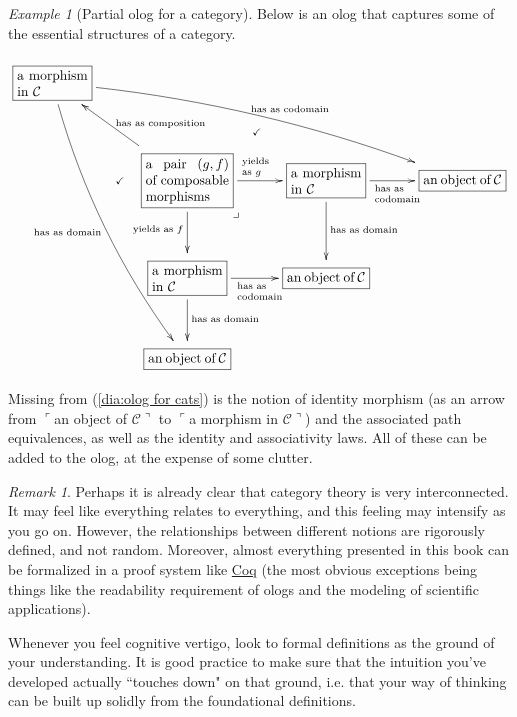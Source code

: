 \documentclass{book}
\def\tn{\textnormal}
\def\mc{\mathcal}
\def\hsp{\hspace{.3in}}
\def\rr{\raggedright}
\newcommand{\obox}[3]{\stackrel{#1}{\fbox{\parbox{#2}{#3}}}}
\newcommand{\fakebox}[1]{\tn{$\ulcorner$#1$\urcorner$}}
\def\mcC{\mc{C}}
\theoremstyle{remark}
\newtheorem{remark}[subsubsection]{Remark}
\newtheorem{example}[subsubsection]{Example}
\theoremstyle{definition}
\begin{document}
\begin{example}[Partial olog for a category]

Below is an olog that captures some of the essential structures of a category.

\begin{align}\label{dia:olog for cats}
\xymatrixnocompile@=30pt{
\obox{}{.72in}{a morphism in $\mcC$}\ar@/^1pc/[drrr]^{\hsp\tn{has as codomain}}\ar@/_1pc/[dddr]_{\tn{has as domain}}&&&\\
&\obox{}{.85in}{a pair $(g,f)$ of composable morphisms}\ar@{}[l]|{\checkmark}\ar@{}[ur]|{\checkmark}\ar[ul]_{\;\;\tn{has as composition}}\ar[r]^{\parbox{.3in}{\scriptsize\rr\tn{yields as $g$}}}\ar[d]_{\tn{yields as $f$}}\ar@{}[rd]|(.35)*+{\lrcorner}&\obox{}{.72in}{a morphism in $\mcC$}\ar[r]_{\parbox{.4in}{\scriptsize\rr\tn{has as codomain}}}\ar[d]^{\tn{has as domain}}&\obox{}{.8in}{an object of $\mcC$}\\
&\obox{}{.72in}{a morphism in $\mcC$}\ar[r]_{\parbox{.4in}{\scriptsize\rr\tn{has as codomain}}}\ar[d]^{\tn{has as domain}}&\obox{}{.8in}{an object of $\mcC$}\\
&\obox{}{.8in}{an object of $\mcC$}
}
\end{align}

Missing from (\ref{dia:olog for cats}) is the notion of identity morphism (as an arrow from \fakebox{an object of $\mcC$} to \fakebox{a morphism in $\mcC$}) and the associated path equivalences, as well as the identity and associativity laws. All of these can be added to the olog, at the expense of some clutter.

\end{example}

\begin{remark}

Perhaps it is already clear that category theory is very interconnected. It may feel like everything relates to everything, and this feeling may intensify as you go on. However, the relationships between different notions are rigorously defined, and not random. Moreover, almost everything presented in this book can be formalized in a proof system like \href{http://en.wikipedia.org/wiki/Coq}{\text Coq} (the most obvious exceptions being things like the readability requirement of ologs and the modeling of scientific applications).

Whenever you feel cognitive vertigo, look to formal definitions as the ground of your understanding. It is good practice to make sure that the intuition you've developed actually ``touches down" on that ground, i.e. that your way of thinking can be built up solidly from the foundational definitions.

\end{remark}
\end{document}
